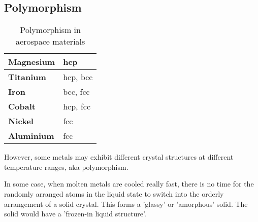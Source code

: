 \subsection{Polymorphism}

\begin{table}[h!]
\centering
\caption{Polymorphism in aerospace materials}
\label{polymorphism-metals}
\begin{tabular}{|l|l|}
\hline
\textbf{Magnesium} & hcp      \\ \hline
\textbf{Titanium}  & hcp, bcc \\ \hline
\textbf{Iron}      & bcc, fcc \\ \hline
\textbf{Cobalt}    & hcp, fcc \\ \hline
\textbf{Nickel}    & fcc      \\ \hline
\textbf{Aluminium} & fcc      \\ \hline
\end{tabular}
\end{table}

However, some metals may exhibit different crystal structures at different temperature ranges, aka polymorphism. 

In some case, when molten metals are cooled really fast, there is no time for the randomly arranged atoms in the liquid state to switch into the orderly arrangement of a solid crystal. This forms a 'glassy' or 'amorphous' solid. The solid would have a 'frozen-in liquid structure'.

